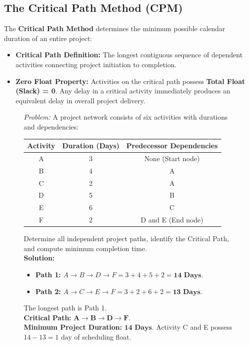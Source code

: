 \subsection{The Critical Path Method (CPM)}
The \textbf{Critical Path Method} determines the minimum possible calendar duration of an entire project:
\begin{itemize}
    \item \textbf{Critical Path Definition:} The longest contiguous sequence of dependent activities connecting project initiation to completion.
    \item \textbf{Zero Float Property:} Activities on the critical path possess \textbf{Total Float (Slack) = 0}. Any delay in a critical activity immediately produces an equivalent delay in overall project delivery.
\end{itemize}
\begin{figure}[htbp]
\centering
\begin{tcolorbox}[colback=codebg, colframe=primary, title=\textbf{Worked Example: CPM Critical Path Determination}]
\textit{Problem:} A project network consists of six activities with durations and dependencies:
\begin{center}
\begin{tabular}{c c c}
\toprule
\textbf{Activity} & \textbf{Duration (Days)} & \textbf{Predecessor Dependencies} \\
\midrule
A & 3 & None (Start node) \\
B & 4 & A \\
C & 2 & A \\
D & 5 & B \\
E & 6 & C \\
F & 2 & D and E (End node) \\
\bottomrule
\end{tabular}
\end{center}
Determine all independent project paths, identify the Critical Path, and compute minimum completion time. \\
\textbf{Solution:}
\begin{itemize}
    \item \textbf{Path 1:} $A \to B \to D \to F = 3 + 4 + 5 + 2 = \mathbf{14\text{ Days}}$.
    \item \textbf{Path 2:} $A \to C \to E \to F = 3 + 2 + 6 + 2 = \mathbf{13\text{ Days}}$.
\end{itemize}
The longest path is Path 1. \\
\textbf{Critical Path:} $\mathbf{A \longrightarrow B \longrightarrow D \longrightarrow F}$. \\
\textbf{Minimum Project Duration:} $\mathbf{14\text{ Days}}$. Activity C and E possess $14 - 13 = 1\text{ day}$ of scheduling float.
\end{tcolorbox}
\end{figure}

